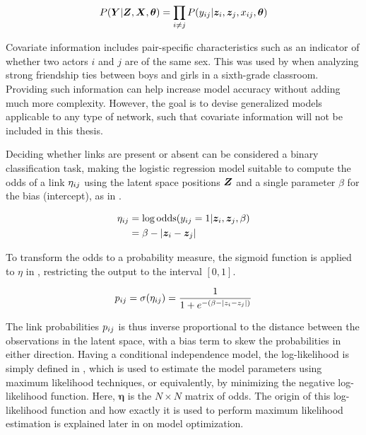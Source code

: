     \begin{equation}\label{eq:lsm-link-proba}
        P(\Y|\Z,\X,\bm{\theta}) = \prod_{i\neq j} P(\sub(y)|\z_i,\z_j,\sub(x),\bm{\theta})
    \end{equation}
    
    Covariate information includes pair-specific characteristics such as an indicator of whether two actors $i$ and $j$ are of the same sex. This was used by \citeauthor*{hoff2002latent} when analyzing strong friendship ties between boys and girls in a sixth-grade classroom. Providing such information can help increase model accuracy without adding much more complexity. However, the goal is to devise generalized models applicable to any type of network, such that covariate information will not be included in this thesis. 
    
    Deciding whether links are present or absent can be considered a binary classification task, making the logistic regression model suitable to compute the odds of a link $\sub(\eta)$ using the latent space positions $\bm{Z}$ and a single parameter $\beta$ for the bias (intercept), as in .
    
    \begin{equation}\label{eq:lsm-link-odds}
        \begin{split}
            \sub(\eta) &= \log \odds(\sub(y)=1|\z_i,\z_j,\beta) \\
                       &= \beta - |\z_i-\z_j|
        \end{split}
    \end{equation}
    
    To transform the odds to a probability measure, the sigmoid function is applied to $\eta$ in , restricting the output to the interval $[0,1]$.
    
    \begin{equation}\label{eq:lsm-link-sigmoid}
        \sub(p) = \sigma(\sub(\eta)) = \frac{1}{1 + e^{-(\beta - |z_i-z_j|)}}
    \end{equation}
    
    The link probabilities $\sub(p)$ is thus inverse proportional to the distance between the observations in the latent space, with a bias term to skew the probabilities in either direction.
    Having a conditional independence model, the log-likelihood is simply defined in , which is used to estimate the model parameters using maximum likelihood techniques, or equivalently, by minimizing the negative log-likelihood function. Here, $\bm{\eta}$ is the $N\times N$ matrix of odds. The origin of this log-likelihood function and how exactly it is used to perform maximum likelihood estimation is explained later in  on model optimization.
    
